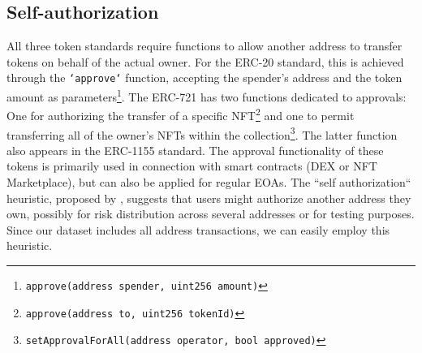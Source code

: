 \documentclass[12pt,a4paper,titlepage,oneside,english]{article}
\begin{document}
\subsection{Self-authorization} 
	All three token standards require functions to allow another address to transfer tokens on behalf of the actual owner. For the ERC-20 standard, this is achieved through the \texttt{`approve`} function, accepting the spender's address and the token amount as parameters\footnote{\texttt{approve(address spender, uint256 amount)}}. The ERC-721 has two functions dedicated to approvals: One for authorizing the transfer of a specific NFT\footnote{\texttt{approve(address to, uint256 tokenId)}} and one to permit transferring all of the owner's NFTs within the collection\footnote{\texttt{setApprovalForAll(address operator, bool approved)}}. The latter function also appears in the ERC-1155 standard. The approval functionality of these tokens is primarily used in connection with smart contracts (DEX or NFT Marketplace), but can also be applied for regular EOAs. \newline
The ``self authorization`` heuristic, proposed by \cite{FV:17}, suggests that users might authorize another address they own, possibly for risk distribution across several addresses or for testing purposes. \newline
Since our dataset includes all address transactions, we can easily employ this heuristic. %


\iffalse
	For the ERC-20 standard: \texttt{approve(address spender, uint256 amount)}
	For the ERC-721 standard: \texttt{approve(address to, uint256 tokenId)} and \texttt{setApprovalForAll(address operator, bool approved)}\\
	For the ERC-1155 standard: \texttt{setApprovalForAll(address operator, bool approved)}
	
	- approve(address,uint256)
	- setApprovalForAll(address,bool) for both ERC-721 and ERC-1155
	
The first step is to get all approval transactions. We achieve this using the 'input'/calldata field. The first X bytes are always the function selector. We filter for the known function selectors for all standards. Next, we get the approved address/spender, also from the calldata, it is always at the same spot. We filter for spenders within the address set and for spenders who are different from the 'from' address. How many transactions are remaining? Finally, we extract all unique pairs of owners and spenders, disregarding the type of token or the amount.
\fi
\end{document}
